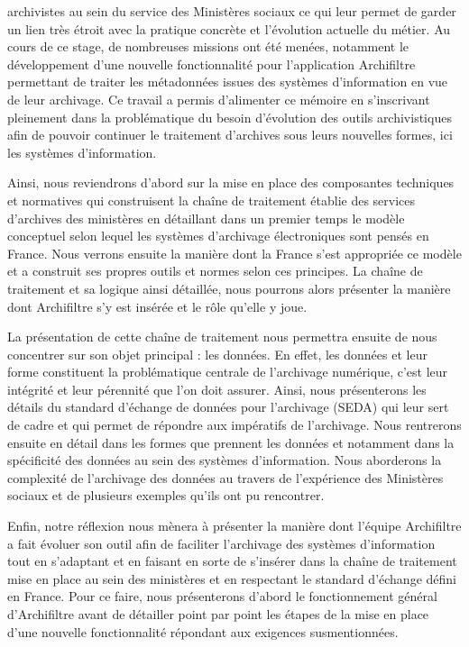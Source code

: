 \documentclass[a4paper,12pt,twoside]{book}
\begin{document}
archivistes au sein du service des Ministères sociaux ce qui leur permet de garder un lien très étroit avec la pratique concrète et l’évolution actuelle du métier. Au cours de ce stage, de nombreuses missions ont été menées, notamment le développement d’une nouvelle fonctionnalité pour l’application \gls{Archifiltre} permettant de traiter les métadonnées issues des systèmes d’information en vue de leur archivage. Ce travail a permis d’alimenter ce mémoire en s’inscrivant pleinement dans la problématique du besoin d’évolution des outils archivistiques afin de pouvoir continuer le traitement d’archives sous leurs nouvelles formes, ici les systèmes d’information.


Ainsi, nous reviendrons d’abord sur la mise en place des composantes techniques et normatives qui construisent la chaîne de traitement établie des services d’archives des ministères en détaillant dans un premier temps le modèle conceptuel selon lequel les systèmes d’archivage électroniques sont pensés en France. Nous verrons ensuite la manière dont la France s’est appropriée ce modèle et a construit ses propres outils et normes selon ces principes. La chaîne de traitement et sa logique ainsi détaillée, nous pourrons alors présenter la manière dont \gls{Archifiltre} s’y est insérée et le rôle qu’elle y joue. 


La présentation de cette chaîne de traitement nous permettra ensuite de nous concentrer sur son objet principal : les données. En effet, les données et leur forme constituent la problématique centrale de l’archivage numérique, c’est leur intégrité et leur pérennité que l’on doit assurer. Ainsi, nous présenterons les détails du standard d’échange de données pour l’archivage (\gls{SEDA}) qui leur sert de cadre et qui permet de répondre aux impératifs de l’archivage. Nous rentrerons ensuite en détail dans les formes que prennent les données et notamment dans la spécificité des données au sein des systèmes d’information. Nous aborderons la complexité de l’archivage des données au travers de l’expérience des Ministères sociaux et de plusieurs exemples qu’ils ont pu rencontrer. 


Enfin, notre réflexion nous mènera à présenter la manière dont l’équipe \gls{Archifiltre} a fait évoluer son outil afin de faciliter l’archivage des systèmes d’information tout en s’adaptant et en faisant en sorte de s’insérer dans la chaîne de traitement mise en place au sein des ministères et en respectant le standard d’échange défini en France. Pour ce faire, nous présenterons d’abord le fonctionnement général d’\gls{Archifiltre} avant de détailler point par point les étapes de la mise en place d’une nouvelle fonctionnalité répondant aux exigences susmentionnées. 
\end{document}

